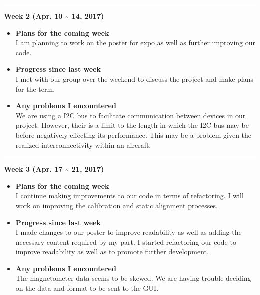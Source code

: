 	\rule{\textwidth}{0.5pt}

	\begin{center}
		\textbf{Week 2 (Apr. 10 {\textasciitilde{}} 14, 2017)}
	\end{center}
	\begin{itemize}
		\item \textbf{Plans for the coming week}
		\\I am planning to work on the poster for expo as well as further improving our code.\\

		\item \textbf{Progress since last week}
		\\I met with our group over the weekend to discuss the project and make plans for the term.\\

		\item \textbf{Any problems I encountered}
		\\We are using a I2C bus to facilitate communication between devices in our project. However, their is a limit to the length in which the I2C bus may be before negatively effecting its performance. This may be a problem given the realized interconnectivity within an aircraft.\\
	\end{itemize}

	\rule{\textwidth}{0.5pt}

	\begin{center}
		\textbf{Week 3 (Apr. 17 {\textasciitilde{}} 21, 2017)}
	\end{center}
	\begin{itemize}
		\item \textbf{Plans for the coming week}
		\\I continue making improvements to our code in terms of refactoring. I will work on improving the calibration and static alignment processes.\\

		\item \textbf{Progress since last week}
		\\I made changes to our poster to improve readability as well as adding the necessary content required by my part. I started refactoring our code to improve readability as well as to promote further development.\\

		\item \textbf{Any problems I encountered}
		\\The magnetometer data seems to be skewed. We are having trouble deciding on the data and format to be sent to the GUI.\\
	\end{itemize}


